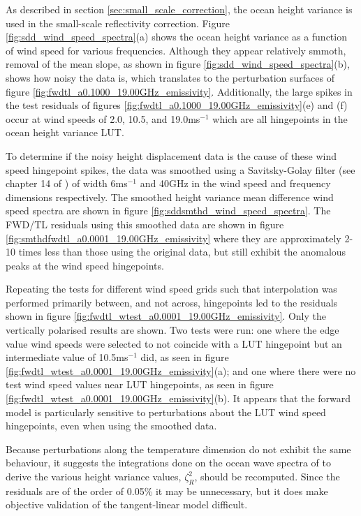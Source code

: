 As described in section \ref{sec:small_scale_correction}, the ocean height variance is used in the small-scale reflectivity correction. Figure \ref{fig:sdd_wind_speed_spectra}(a) shows the ocean height variance as a function of wind speed for various frequencies. Although they appear relatively smmoth, removal of the mean slope, as shown in figure \ref{fig:sdd_wind_speed_spectra}(b), shows how noisy the data is, which translates to the perturbation surfaces of figure \ref{fig:fwdtl_a0.1000_19.00GHz_emissivity}. Additionally, the large spikes in the test residuals of figures \ref{fig:fwdtl_a0.1000_19.00GHz_emissivity}(e) and (f) occur at wind speeds of 2.0, 10.5, and 19.0ms$^{-1}$ which are all hingepoints in the ocean height variance LUT.

To determine if the noisy height displacement data is the cause of these wind speed hingepoint spikes, the data was smoothed using a Savitsky-Golay filter (see chapter 14 of \citet{NumericalRecipes_Fortran}) of width 6ms$^{-1}$ and 40GHz in the wind speed and frequency dimensions respectively. The smoothed height variance mean difference wind speed spectra are shown in figure \ref{fig:sddsmthd_wind_speed_spectra}. The FWD/TL residuals using this smoothed data are shown in figure \ref{fig:smthdfwdtl_a0.0001_19.00GHz_emissivity} where they are approximately 2-10 times less than those using the original data, but still exhibit the anomalous peaks at the wind speed hingepoints.

Repeating the tests for different wind speed grids such that interpolation was performed primarily between, and not across, hingepoints led to the residuals shown in figure \ref{fig:fwdtl_wtest_a0.0001_19.00GHz_emissivity}. Only the vertically polarised results are shown. Two tests were run: one where the edge value wind speeds were selected to not coincide with a LUT hingepoint but an intermediate value of 10.5ms$^{-1}$ did, as seen in figure \ref{fig:fwdtl_wtest_a0.0001_19.00GHz_emissivity}(a); and one where there were no test wind speed values near LUT hingepoints, as seen in figure \ref{fig:fwdtl_wtest_a0.0001_19.00GHz_emissivity}(b). It appears that the forward model is particularly sensitive to perturbations about the LUT wind speed hingepoints, even when using the smoothed data.

Because perturbations along the temperature dimension do not exhibit the same behaviour, it suggests the integrations done on the ocean wave spectra of \citet{BjerkaasRiedel_1979} to derive the various height variance values, $\zeta^2_R$, should be recomputed. Since the residuals are of the order of 0.05\% it may be unnecessary, but it does make objective validation of the tangent-linear model difficult.

